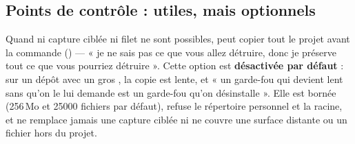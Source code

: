 \subsection{Points de contrôle : utiles, mais optionnels}
Quand ni capture ciblée ni filet ne sont possibles, \demo{} peut copier tout le projet avant
la commande () --- « je ne sais pas ce que vous allez détruire, donc je
préserve tout ce que vous pourriez détruire ». Cette option est \textbf{désactivée par
défaut} : sur un dépôt avec un gros , la copie est lente, et « un garde-fou
qui devient lent sans qu'on le lui demande est un garde-fou qu'on désinstalle ». Elle est
bornée (256\,Mo et \num{25000} fichiers par défaut), refuse le répertoire personnel et la
racine, et ne remplace jamais une capture ciblée ni ne couvre une surface distante ou un
fichier hors du projet.

